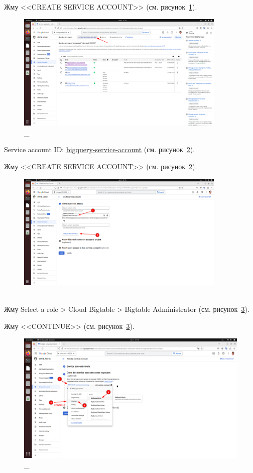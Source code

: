 \documentclass[12pt, a4paper, simple]{eskdtext}
\begin{document}
  Жму <<CREATE SERVICE ACCOUNT>> (см. рисунок~\ref{fig:18}).

  \begin{figure}[!h]
    \centering
    \includegraphics[width=10cm]
    {images/GoogleCloudBigQuery/2023-03-01_22-10-50.png}
    \caption{\_}
    \label{fig:18}
  \end{figure}

  Service account ID: \underline{bigquery-service-account} (см. рисунок~\ref{fig:19}).

  Жму <<CREATE SERVICE ACCOUNT>> (см. рисунок~\ref{fig:19}).

  \begin{figure}[!h]
    \centering
    \includegraphics[width=10cm]
    {images/GoogleCloudBigQuery/2023-03-01_22-15-46.png}
    \caption{\_}
    \label{fig:19}
  \end{figure}

  Жму Select a role > Cloud Bigtable > Bigtable Administrator (см. рисунок~\ref{fig:20}).

  Жму <<CONTINUE>> (см. рисунок~\ref{fig:20}).

  \begin{figure}[!h]
    \centering
    \includegraphics[width=18cm]
    {images/GoogleCloudBigQuery/2023-03-01_22-17-10.png}
    \caption{\_}
    \label{fig:20}
  \end{figure}
\end{document}
